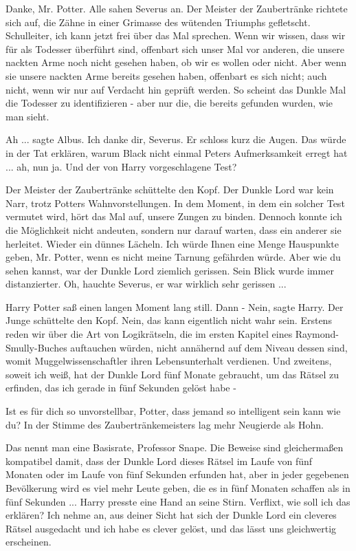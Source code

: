 \glqq{}Danke, Mr. Potter.\grqq{} Alle sahen Severus an. Der Meister der
Zaubertränke richtete sich auf, die Zähne in einer Grimasse des wütenden
Triumphs gefletscht. \glqq{}Schulleiter, ich kann jetzt frei über das Mal
sprechen. Wenn wir wissen, dass wir für als Todesser überführt sind, offenbart
sich unser Mal vor anderen, die unsere nackten Arme noch nicht gesehen haben, ob
wir es wollen oder nicht. Aber wenn sie unsere nackten Arme bereits gesehen
haben, offenbart es sich nicht; auch nicht, wenn wir nur auf Verdacht hin
geprüft werden. So scheint das Dunkle Mal die Todesser zu identifizieren - aber
nur die, die bereits gefunden wurden, wie man sieht.\grqq{}

\glqq{}Ah ...\grqq{} sagte Albus. \glqq{}Ich danke dir, Severus.\grqq{} Er schloss
kurz die Augen. \glqq{}Das würde in der Tat erklären, warum Black nicht einmal
Peters Aufmerksamkeit erregt hat ... ah, nun ja. Und der von Harry
vorgeschlagene Test?\grqq{}

Der Meister der Zaubertränke schüttelte den Kopf. \glqq{}Der Dunkle Lord war kein
Narr, trotz Potters Wahnvorstellungen. In dem Moment, in dem ein solcher Test
vermutet wird, hört das Mal auf, unsere Zungen zu binden. Dennoch konnte ich die
Möglichkeit nicht andeuten, sondern nur darauf warten, dass ein anderer sie
herleitet.\grqq{} Wieder ein dünnes Lächeln. \glqq{}Ich würde Ihnen eine Menge
Hauspunkte geben, Mr. Potter, wenn es nicht meine Tarnung gefährden würde. Aber
wie du sehen kannst, war der Dunkle Lord ziemlich gerissen.\grqq{} Sein Blick
wurde immer distanzierter. \glqq{}Oh\grqq{}, hauchte Severus, \glqq{}er war
wirklich sehr gerissen ...\grqq{}

Harry Potter saß einen langen Moment lang still. Dann - \glqq{}Nein\grqq{}, sagte
Harry. Der Junge schüttelte den Kopf. \glqq{}Nein, das kann eigentlich nicht wahr
sein. Erstens reden wir über die Art von Logikrätseln, die im ersten Kapitel
eines Raymond-Smully-Buches auftauchen würden, nicht annähernd auf dem Niveau
dessen sind, womit Muggelwissenschaftler ihren Lebensunterhalt verdienen. Und
zweitens, soweit ich weiß, hat der Dunkle Lord fünf Monate gebraucht, um das
Rätsel zu erfinden, das ich gerade in fünf Sekunden gelöst habe -\grqq{}

\glqq{}Ist es für dich so unvorstellbar, Potter, dass jemand so intelligent sein
kann wie du?\grqq{} In der Stimme des Zaubertränkemeisters lag mehr Neugierde
als Hohn.

\glqq{}Das nennt man eine Basisrate, Professor Snape. Die Beweise sind
gleichermaßen kompatibel damit, dass der Dunkle Lord dieses Rätsel im Laufe von
fünf Monaten oder im Laufe von fünf Sekunden erfunden hat, aber in jeder
gegebenen Bevölkerung wird es viel mehr Leute geben, die es in fünf Monaten
schaffen als in fünf Sekunden ...\grqq{} Harry presste eine Hand an seine Stirn.
\glqq{}Verflixt, wie soll ich das erklären? Ich nehme an, aus deiner Sicht hat
sich der Dunkle Lord ein cleveres Rätsel ausgedacht und ich habe es clever
gelöst, und das lässt uns gleichwertig erscheinen.\grqq{}

